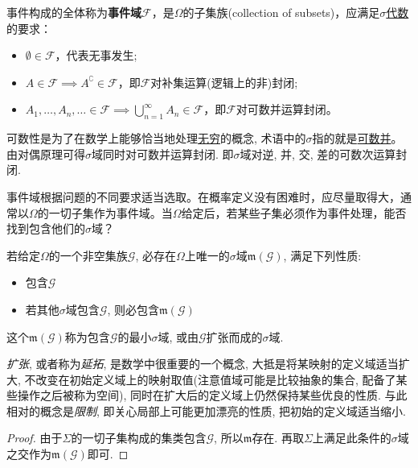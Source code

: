 \begin{definition}[事件域]
    事件构成的全体称为\textbf{事件域}$\mathscr{F}$，是$\Omega$的子集族(collection of subsets)，应满足\underline{$\sigma$代数}的要求：
    \begin{itemize}
        \item$\emptyset \in \mathscr{F}$，代表无事发生;
        \item$A\in\mathscr{F} \implies A^{\complement}\in\mathscr{F}$，即$\mathscr{F}$对补集运算(逻辑上的非)封闭;
        \item$A_{1},\dots,A_{n},\ldots \in \mathscr{F} \implies \bigcup_{n=1}^{\infty}A_{n} \in \mathscr{F}$，即$\mathscr{F}$对可数并运算封闭。
    \end{itemize}
\end{definition}

\begin{remark}
    可数性是为了在数学上能够恰当地处理\underline{无穷}的概念, 术语中的$\sigma$指的就是\underline{可数并}。由对偶原理可得$\sigma$域同时对可数并运算封闭. 即$\sigma$域对逆, 并, 交, 差的可数次运算封闭.
\end{remark}

事件域根据问题的不同要求适当选取。在概率定义没有困难时，应尽量取得大，通常以$\Omega$的一切子集作为事件域。当$\Omega$给定后，若某些子集必须作为事件处理，能否找到包含他们的$\sigma$域？

\begin{proposition}
    若给定$\Omega$的一个非空集族$\mathscr{G}$, 必存在$\Omega$上唯一的$\sigma$域$\mathfrak{m}(\mathscr{G})$, 满足下列性质:
    \begin{itemize}
        \item 包含$\mathscr{G}$
        \item 若其他$\sigma$域包含$\mathscr{G}$, 则必包含$\mathfrak{m}(\mathscr{G})$
    \end{itemize}
    这个$\mathfrak{m}(\mathscr{G})$称为包含$\mathscr{G}$的最小$\sigma$域, 或由$\mathscr{G}$扩张而成的$\sigma$域.
\end{proposition}

\emph{扩张}, 或者称为\emph{延拓}, 是数学中很重要的一个概念, 大抵是将某映射的定义域适当扩大, 不改变在初始定义域上的映射取值(注意值域可能是比较抽象的集合, 配备了某些操作之后被称为空间), 同时在扩大后的定义域上仍然保持某些优良的性质. 与此相对的概念是\emph{限制}, 即关心局部上可能更加漂亮的性质, 把初始的定义域适当缩小.

\begin{proof}
    由于$\Sigma$的一切子集构成的集类包含$\mathscr{G}$, 所以$\mathfrak{m}$存在. 再取$\Sigma$上满足此条件的$\sigma$域之交作为$\mathfrak{m}(\mathscr{G})$即可.
\end{proof}

